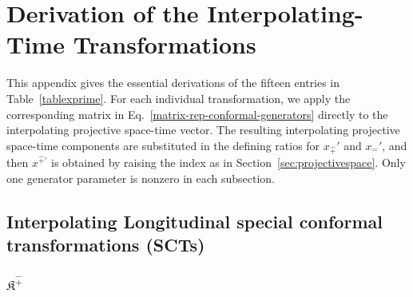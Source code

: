 \documentclass[foundations,article,submit,pdftex,moreauthors]{Definitions/mdpi}
\begin{document}
\section{Derivation of the Interpolating-Time Transformations}
\label{app:interpolating-time-derivations}

This appendix gives the essential derivations of the fifteen entries in
Table~\ref{tablexprime}. For each individual transformation, we apply the
corresponding matrix in Eq.~\eqref{matrix-rep-conformal-generators} directly
to the interpolating projective space-time vector. The resulting interpolating
projective space-time components are substituted
in the defining ratios for $x_{\hat{+}}'$ and $x_{\hat{-}}'$, and then
$x^{\hat{+}\prime}$ is obtained by raising the index as in
Section~\ref{sec:projectivespace}.
Only one generator parameter is nonzero in each subsection.

\subsection{Interpolating Longitudinal special conformal transformations (SCTs)}

\subsubsection{\texorpdfstring{$\mathfrak{K}^{\hat{+}}$}{K hat plus}}
\end{document}
